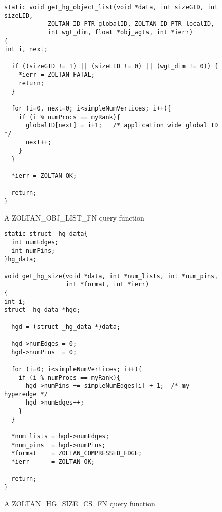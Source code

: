 \begin{figure}
\begin{flushleft}
\begin{verbatim}
static void get_hg_object_list(void *data, int sizeGID, int sizeLID,
            ZOLTAN_ID_PTR globalID, ZOLTAN_ID_PTR localID,
            int wgt_dim, float *obj_wgts, int *ierr)
{
int i, next;

  if ((sizeGID != 1) || (sizeLID != 0) || (wgt_dim != 0)) {
    *ierr = ZOLTAN_FATAL;
    return;
  }

  for (i=0, next=0; i<simpleNumVertices; i++){
    if (i % numProcs == myRank){
      globalID[next] = i+1;   /* application wide global ID */
      next++;
    }
  }

  *ierr = ZOLTAN_OK;

  return;
}
\end{verbatim}
\end{flushleft}
\caption{A ZOLTAN\_OBJ\_LIST\_FN query function}
\label{fig:ObjList2}
\end{figure}

\begin{figure}
\begin{flushleft}
\begin{verbatim}
static struct _hg_data{
  int numEdges;
  int numPins;
}hg_data;

void get_hg_size(void *data, int *num_lists, int *num_pins,
                 int *format, int *ierr)
{
int i;
struct _hg_data *hgd;

  hgd = (struct _hg_data *)data;

  hgd->numEdges = 0;
  hgd->numPins  = 0;

  for (i=0; i<simpleNumVertices; i++){
    if (i % numProcs == myRank){
      hgd->numPins += simpleNumEdges[i] + 1;  /* my hyperedge */
      hgd->numEdges++;
    }
  }

  *num_lists = hgd->numEdges;
  *num_pins  = hgd->numPins;
  *format    = ZOLTAN_COMPRESSED_EDGE;
  *ierr      = ZOLTAN_OK;

  return;
}
\end{verbatim}
\end{flushleft}
\caption{A ZOLTAN\_HG\_SIZE\_CS\_FN query function}
\label{fig:SizeCS}
\end{figure}

